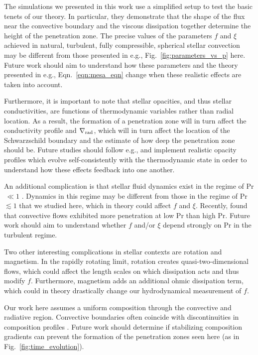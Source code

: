 \documentclass[twocolumn]{aastex631}
\newcommand{\gradrad}{\ensuremath{\nabla_{\rm{rad}}}}
\newcommand\Pran{\ensuremath{\mathrm{Pr}}}
\begin{document}
The simulations we presented in this work use a simplified setup to test the basic tenets of our theory.
In particular, they demonstrate that the shape of the flux near the convective boundary and the viscous dissipation together determine the height of the penetration zone.
The precise values of the parameters $f$ and $\xi$ achieved in natural, turbulent, fully compressible, spherical stellar convection may be different from those presented in e.g., Fig.~\ref{fig:parameters_vs_p} here.
Future work should aim to understand how these parameters and the theory presented in e.g., Eqn.~\ref{eqn:mesa_eqn} change when these realistic effects are taken into account.

Furthermore, it is important to note that stellar opacities, and thus stellar conductivities, are functions of thermodynamic variables rather than radial location.
As a result, the formation of a penetration zone will in turn affect the conductivity profile and $\gradrad$, which will in turn affect the location of the Schwarzschild boundary and the estimate of how deep the penetration zone should be.
Future studies should follow e.g., \citet{kapyla_etal_2017} and implement realistic opacity profiles which evolve self-consistently with the thermodynamic state in order to understand how these effects feedback into one another.

An additional complication is that stellar fluid dynamics exist in the regime of Pr$\,\ll1$ \citep{garaud2021}.
Dynamics in this regime may be different from those in the regime of Pr $\lesssim 1$ that we studied here, which in theory could affect $f$ and $\xi$.
Recently, \citet{kapyla2021} found that convective flows exhibited more penetration at low Pr than high Pr.
Future work should aim to understand whether $f$ and/or $\xi$ depend strongly on $\Pran$ in the turbulent regime.

Two other interesting complications in stellar contexts are rotation and magnetism.
In the rapidly rotating limit, rotation creates quasi-two-dimensional flows, which could affect the length scales on which dissipation acts and thus modify $f$.
Furthermore, magnetism adds an additional ohmic dissipation term, which could in theory drastically change our hydrodynamical measurement of $f$.

Our work here assumes a uniform composition through the convective and radiative region.
Convective boundaries often coincide with discontinuities in composition profiles \citep{salaris_cassisi_2017}.
Future work should determine if stabilizing composition gradients can prevent the formation of the penetration zones seen here (as in Fig.~\ref{fig:time_evolution}).
\end{document}
